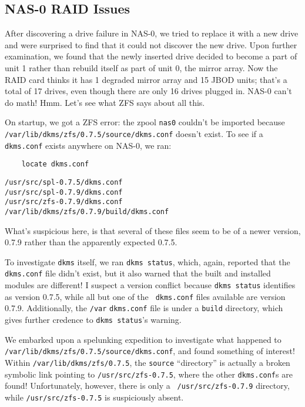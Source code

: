 \documentclass[12pt]{article}
\begin{document}

\subsection{NAS-0 RAID Issues}

\qq After discovering a drive failure in NAS-0, we tried to replace it with a
new drive and were surprised to find that it could not discover the new
drive. Upon further examination, we found that the newly inserted drive decided
to become a part of unit 1 rather than rebuild itself as part of unit 0, the
mirror array. Now the RAID card thinks it has 1 degraded mirror array and 15
JBOD units; that's a total of 17 drives, even though there are only 16 drives
plugged in. NAS-0 can't do math! Hmm. Let's see what ZFS says about all this.

\qq On startup, we got a ZFS error: the zpool {\tt nas0} couldn't be imported
because \\ {\tt /var/lib/dkms/zfs/0.7.5/source/dkms.conf} doesn't exist. To see if
a {\tt dkms.conf} exists anywhere on NAS-0, we ran:

\begin{tcolorbox}[colback=white, colframe=black]
  \begin{verbatim}
    locate dkms.conf
  \end{verbatim}
  \tcblower
  {\tt /usr/src/spl-0.7.5/dkms.conf} \\
  {\tt /usr/src/spl-0.7.9/dkms.conf} \\
  {\tt /usr/src/zfs-0.7.9/dkms.conf} \\
  {\tt /var/lib/dkms/zfs/0.7.9/build/dkms.conf} \\
\end{tcolorbox}

What's suspicious here, is that several of these files seem to be of a newer
version, 0.7.9 rather than the apparently expected 0.7.5.

\qq To investigate {\tt dkms} itself, we ran {\tt dkms status}, which, again,
reported that the {\tt dkms.conf} file didn't exist, but it also warned that the
built and installed modules are different! I suspect a version conflict because
{\tt dkms status} identifies as version 0.7.5, while all but one of the {\tt
  dkms.conf} files available are version 0.7.9. Additionally, the {\tt /var}
{\tt dkms.conf} file is under a {\tt build} directory, which gives further
credence to {\tt dkms status}'s warning.

\qq We embarked upon a spelunking expedition to investigate what happened to\\
{\tt /var/lib/dkms/zfs/0.7.5/source/dkms.conf}, and found something of
interest!\\
Within {\tt /var/lib/dkms/zfs/0.7.5}, the {\tt source} ``directory'' is actually
a broken symbolic link pointing to {\tt /usr/src/zfs-0.7.5}, where the other
{\tt dkms.conf}s are found! Unfortunately, however, there is only a {\tt
  /usr/src/zfs-0.7.9} directory, while {\tt /usr/src/zfs-0.7.5} is suspiciously
absent.
\end{document}
